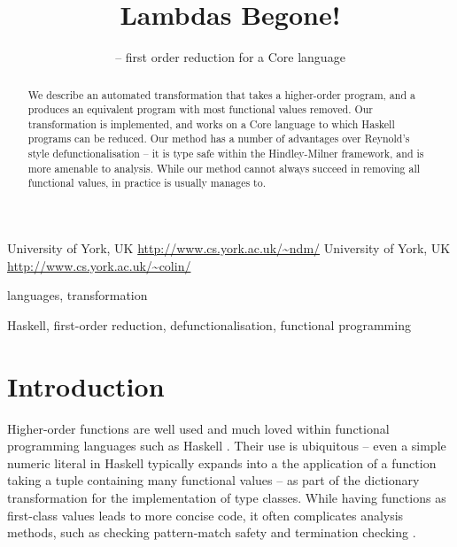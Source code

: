 \documentclass[preprint]{sigplanconf}
\let\cite=\citep
\begin{document}
\copyrightdata{[to be supplied]}

\titlebanner{\today{} - \currenttime{}}        %
\preprintfooter{}   %

\title{Lambdas Begone!}
\subtitle{ -- first order reduction for a Core language}

           {University of York, UK}
           {\url{http://www.cs.york.ac.uk/~ndm/}}
           {University of York, UK}
           {\url{http://www.cs.york.ac.uk/~colin/}}

\maketitle

\begin{abstract}
We describe an automated transformation that takes a higher-order program, and a produces an equivalent program with most functional values removed. Our transformation is implemented, and works on a Core language to which Haskell programs can be reduced. Our method has a number of advantages over Reynold's style defunctionalisation -- it is type safe within the Hindley-Milner framework, and is more amenable to analysis. While our method cannot always succeed in removing all functional values, in practice is usually manages to.
\end{abstract}


\terms
languages, transformation

\keywords
Haskell, first-order reduction, defunctionalisation, functional programming

\section{Introduction}

Higher-order functions are well used and much loved within functional programming languages such as Haskell \cite{haskell}. Their use is ubiquitous -- even a simple numeric literal in Haskell typically expands into a the application of a function taking a tuple containing many functional values -- as part of the dictionary transformation for the implementation of type classes. While having functions as first-class values leads to more concise code, it often complicates analysis methods, such as checking pattern-match safety \cite{catch} and termination checking \cite{termination_checking}.
\end{document}
